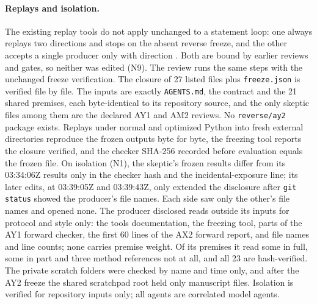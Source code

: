 \paragraph{Replays and isolation.}
The existing replay tools do not apply unchanged to a statement loop: one
always replays two directions and stops on the absent reverse freeze, and
the other accepts a single producer only with direction
. Both are bound by earlier reviews and gates, so
neither was edited (N9). The review runs the same steps with the unchanged
freeze verification. The closure of 27 listed files plus \texttt{freeze.json}
is verified file by file. The inputs are exactly \texttt{AGENTS.md}, the
contract and the 21 shared premises, each byte-identical to its repository
source, and the only skeptic files among them are the declared AY1 and AM2
reviews. No \texttt{reverse/ay2} package exists. Replays under normal and
optimized Python into fresh external directories reproduce the frozen
outputs byte for byte, the freezing tool reports the closure verified, and
the checker SHA-256 recorded before evaluation equals the frozen file. On
isolation (N1), the skeptic's frozen results differ from its 03:34:06Z
results only in the checker hash and the incidental-exposure line; its later
edits, at 03:39:05Z and 03:39:43Z, only extended the disclosure after
\texttt{git status} showed the producer's file names. Each side saw only the
other's file names and opened none. The producer disclosed reads outside its
inputs for protocol and style only: the tools documentation, the freezing
tool, parts of the AY1 forward checker, the first 60 lines of the AX2 forward
report, and file names and line counts; none carries premise weight. Of its
premises it read some in full, some in part and three method references not
at all, and all 23 are hash-verified. The private scratch folders were
checked by name and time only, and after the AY2 freeze the shared scratchpad
root held only manuscript files. Isolation is verified for repository inputs
only; all agents are correlated model agents.

